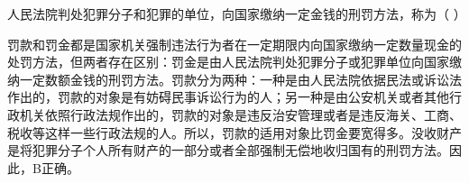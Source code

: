 \question 人民法院判处犯罪分子和犯罪的单位，向国家缴纳一定金钱的刑罚方法，称为（
）
\par{}
\begin{solution}罚款和罚金都是国家机关强制违法行为者在一定期限内向国家缴纳一定数量现金的处罚方法，但两者存在区别：罚金是由人民法院判处犯罪分子或犯罪单位向国家缴纳一定数额金钱的刑罚方法。罚款分为两种：一种是由人民法院依据民法或诉讼法作出的，罚款的对象是有妨碍民事诉讼行为的人；另一种是由公安机关或者其他行政机关依照行政法规作出的，罚款的对象是违反治安管理或者是违反海关、工商、税收等这样一些行政法规的人。所以，罚款的适用对象比罚金要宽得多。没收财产是将犯罪分子个人所有财产的一部分或者全部强制无偿地收归国有的刑罚方法。因此，B正确。
\end{solution}
